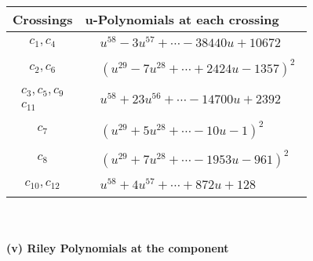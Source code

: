 \documentclass[1p]{elsarticle_modified}
\theoremstyle{definition}
\begin{document}
\begin{tabular}{m{50pt}|m{274pt}}
Crossings & \hspace{64pt}u-Polynomials at each crossing \\
\hline $$\begin{aligned}c_{1},c_{4}\end{aligned}$$&$\begin{aligned}
&u^{58}-3 u^{57}+\cdots-38440 u+10672
\end{aligned}$\\
\hline $$\begin{aligned}c_{2},c_{6}\end{aligned}$$&$\begin{aligned}
&(u^{29}-7 u^{28}+\cdots+2424 u-1357)^{2}
\end{aligned}$\\
\hline $$\begin{aligned}c_{3},c_{5},c_{9}\\c_{11}\end{aligned}$$&$\begin{aligned}
&u^{58}+23 u^{56}+\cdots-14700 u+2392
\end{aligned}$\\
\hline $$\begin{aligned}c_{7}\end{aligned}$$&$\begin{aligned}
&(u^{29}+5 u^{28}+\cdots-10 u-1)^{2}
\end{aligned}$\\
\hline $$\begin{aligned}c_{8}\end{aligned}$$&$\begin{aligned}
&(u^{29}+7 u^{28}+\cdots-1953 u-961)^{2}
\end{aligned}$\\
\hline $$\begin{aligned}c_{10},c_{12}\end{aligned}$$&$\begin{aligned}
&u^{58}+4 u^{57}+\cdots+872 u+128
\end{aligned}$\\
\hline
\end{tabular}\\~\\
\newpage\renewcommand{\arraystretch}{1}
\flushleft \textbf{(v) Riley Polynomials at the component}\newline \\
\end{document}
